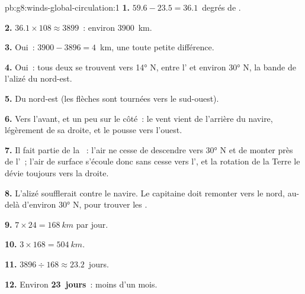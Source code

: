 \begin{solution}{pb:g8:winds-global-circulation:1}
\textbf{1.} $59.6 - 23.5 = 36.1$~degrés de .

\textbf{2.} $36.1 \times 108 \approx 3899$~: environ \qty{3900}{km}.

\textbf{3.} Oui~: $3900 - 3896 = 4$~km, une toute petite différence.

\textbf{4.} Oui~: tous deux se trouvent vers \ang{14} N, entre l'
et environ \ang{30} N, la bande de l'alizé du nord-est.

\textbf{5.} Du nord-est (les flèches sont tournées vers le sud-ouest).

\textbf{6.} Vers l'avant, et un peu sur le côté~: le vent vient de
l'arrière du navire, légèrement de sa droite, et le pousse vers l'ouest.

\textbf{7.} Il fait partie de la ~: l'air ne cesse de
descendre vers \ang{30} N et de monter près de l'~; l'air de
surface s'écoule donc sans cesse vers l', et la rotation de la
Terre le dévie toujours vers la droite.

\textbf{8.} L'alizé soufflerait contre le navire. Le capitaine doit
remonter vers le nord, au-delà d'environ \ang{30} N, pour trouver les
.

\textbf{9.} $7 \times 24 = \qty{168}{km}$ par jour.

\textbf{10.} $3 \times 168 = \qty{504}{km}$.

\textbf{11.} $3896 \div 168 \approx 23.2$~jours.

\textbf{12.} Environ \textbf{23~jours}~: moins d'un mois.
\end{solution}
